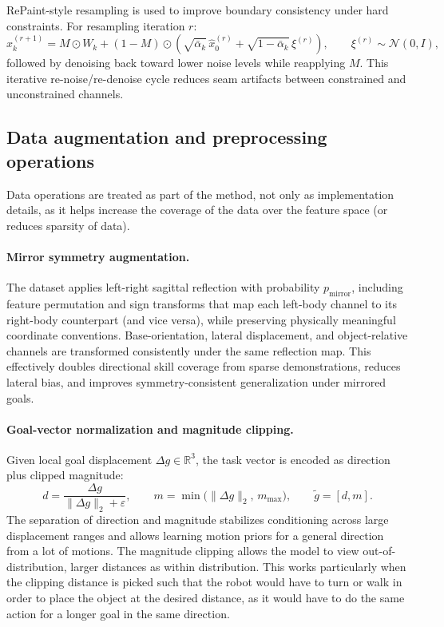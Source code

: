 RePaint-style resampling is used to improve boundary consistency under hard constraints. For resampling iteration $r$:
\[
x_k^{(r+1)}
=
M\odot W_k
+(1-M)\odot\left(\sqrt{\bar\alpha_k}\,\hat x_0^{(r)}+\sqrt{1-\bar\alpha_k}\,\xi^{(r)}\right),
\qquad
\xi^{(r)}\sim\mathcal{N}(0,I),
\]
followed by denoising back toward lower noise levels while reapplying $M$. This iterative re-noise/re-denoise cycle reduces seam artifacts between constrained and unconstrained channels.

\subsection{Data augmentation and preprocessing operations}

Data operations are treated as part of the method, not only as implementation details, as it helps increase the coverage of the data over the feature space (or reduces sparsity of data).

\paragraph{Mirror symmetry augmentation.}
The dataset applies left-right sagittal reflection with probability $p_{\mathrm{mirror}}$, including feature permutation and sign transforms that map each left-body channel to its right-body counterpart (and vice versa), while preserving physically meaningful coordinate conventions. Base-orientation, lateral displacement, and object-relative channels are transformed consistently under the same reflection map. This effectively doubles directional skill coverage from sparse demonstrations, reduces lateral bias, and improves symmetry-consistent generalization under mirrored goals.

\paragraph{Goal-vector normalization and magnitude clipping.}
Given local goal displacement $\Delta g\in\mathbb{R}^{3}$, the task vector is encoded as direction plus clipped magnitude:
\[
d=\frac{\Delta g}{\|\Delta g\|_2+\varepsilon},
\qquad
m=\min\big(\|\Delta g\|_2,\,m_{\max}\big),
\qquad
\tilde g=[d,m].
\]
The separation of direction and magnitude stabilizes conditioning across large displacement ranges and allows learning motion priors for a general direction from a lot of motions. The magnitude clipping allows the model to view out-of-distribution, larger distances as within distribution. This works particularly when the clipping distance is picked such that the robot would have to turn or walk in order to place the object at the desired distance, as it would have to do the same action for a longer goal in the same direction.

